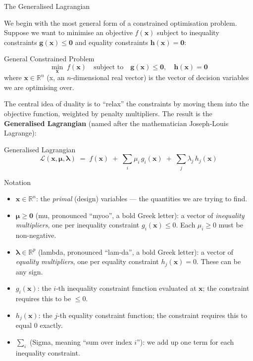 \documentclass[aspectratio=169,10pt]{beamer}
\newcommand{\bx}{\mathbf{x}}
\newcommand{\bg}{\mathbf{g}}
\newcommand{\bh}{\mathbf{h}}
\newcommand{\bmu}{\boldsymbol{\mu}}
\newcommand{\blam}{\boldsymbol{\lambda}}
\newcommand{\R}{\mathbb{R}}
\newcommand{\calL}{\mathcal{L}}
\begin{document}
\begin{frame}[allowframebreaks]{The Generalised Lagrangian}

  We begin with the most general form of a constrained optimisation problem.
  Suppose we want to minimise an objective $f(\bx)$ subject to inequality
  constraints $\bg(\bx) \le \mathbf{0}$ and equality constraints
  $\bh(\bx) = \mathbf{0}$:

  \begin{block}{General Constrained Problem}
    \[
      \min_{\bx}\; f(\bx) \quad \text{subject to} \quad
      \bg(\bx) \le \mathbf{0},\quad \bh(\bx) = \mathbf{0}
    \]
    where $\bx \in \R^n$ (x, an $n$-dimensional real vector) is the vector of
    decision variables we are optimising over.
  \end{block}

  \medskip
  The central idea of duality is to ``relax'' the constraints by moving them
  into the objective function, weighted by penalty multipliers.  The result
  is the \textbf{Generalised Lagrangian} (named after the mathematician
  Joseph-Louis Lagrange):

  \begin{block}{Generalised Lagrangian}
    \[
      \calL(\bx, \bmu, \blam)
      \;=\; f(\bx)
      \;+\; \sum_i \mu_i\, g_i(\bx)
      \;+\; \sum_j \lambda_j\, h_j(\bx)
    \]
  \end{block}

  \begin{block}{Notation}
    \begin{itemize}
      \item $\bx \in \R^n$: the \emph{primal} (design) variables --- the
            quantities we are trying to find.
      \item $\bmu \ge \mathbf{0}$ (mu, pronounced ``myoo'', a bold Greek
            letter): a vector of \emph{inequality multipliers}, one per
            inequality constraint $g_i(\bx) \le 0$.  Each $\mu_i \ge 0$
            must be non-negative.
      \item $\blam \in \R^p$ (lambda, pronounced ``lam-da'', a bold Greek
            letter): a vector of \emph{equality multipliers}, one per
            equality constraint $h_j(\bx) = 0$.  These can be any sign.
      \item $g_i(\bx)$: the $i$-th inequality constraint function evaluated
            at $\bx$; the constraint requires this to be $\le 0$.
      \item $h_j(\bx)$: the $j$-th equality constraint function; the
            constraint requires this to equal $0$ exactly.
      \item $\sum_i$ (Sigma, meaning ``sum over index $i$''): we add up one
            term for each inequality constraint.
    \end{itemize}
  \end{block}


\end{frame}
\end{document}
